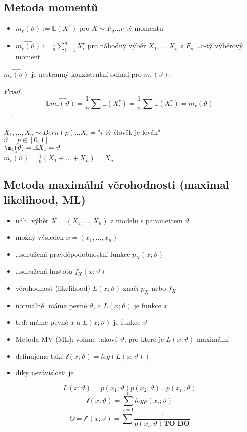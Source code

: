 \documentclass[../main.tex]{subfiles}
\begin{document}
\subsection{Metoda momentů}
\begin{itemize}
    \item $m_r(\vartheta) := \mathbb{E}(X^r)$ pro $X \sim F_\vartheta \dots r$-tý momentu
    \item $\widehat{m_r(\vartheta)}:= \frac{1}{n} \sum^n_{i=1}X^r_i$ pro náhodný výběr $X_1,\dots,X_n$ z $F_\vartheta$ \dots $r$-tý výběrový moment
\end{itemize}
\begin{theorem}
    $\widehat{m_r(\vartheta)}$ je nestranný konzistentní odhad pro $m_r(\vartheta)$.
    \begin{proof}
        \[\mathbb{E}\widehat{m_r(\vartheta)} = \frac{1}{n} \sum \mathbb{E}(X^r_i) = \frac{1}{n}\sum \mathbb{E}(X^r_i) = m_r(\vartheta)\]
    \end{proof}
\end{theorem}
\begin{example}
    $X_1,\dots,X_n \sim Bern(p) \dots X_i = $"$i$-tý člověk je levák"\\
    $\vartheta = p \in \left[0,1\right]$\\
    $\m_1(\vartheta) = \mathbb{E}X_1 = \vartheta$\\
    $\widehat{m_r(\vartheta)} = \frac{1}{n}(X_1+\dots+X_n) = \overline{X}_n$
\end{example}

\subsection{Metoda maximální věrohodnosti (maximal likelihood, ML)}
\begin{itemize}
    \item náh. výběr $X = (X_1,\dots,X_n)$ z modelu s parametrem $\vartheta$
    \item možný výsledek $x = (x_1,\dots,x_n)$
    \item \dots sdružená pravděpodobnostní funkce $p_X(x;\vartheta)$
    \item \dots sdružená hustota $f_X(x;\vartheta)$
    \item věrohodnost (likelihood) $L(x;\vartheta)$ značí $p_X$ nebo $f_X$
    \item normálně: máme pevné $\vartheta$, a $L(x;\vartheta)$ je funkce $x$
    \item teď: máme pevné $x$ a $L(x;\vartheta)$ je funkce $\vartheta$
\end{itemize}
\begin{itemize}
    \item Metoda MV (ML): volíme takové $\vartheta$, pro které je $L(x;\vartheta)$ maximální
    \item definujeme také $\mathcal{l}(x;\vartheta) = log(L(x;\vartheta))$
    \item díky nezávislosti je
\end{itemize}
\[L(x;\vartheta) = p(x_1;\vartheta)p(x_2;\vartheta)\dots p(x_n;\vartheta)\]
\[\mathcal{l}(x;\vartheta) = \sum^n_{i=1} log p(x_i;\vartheta)\]
\[ O = \mathcal{l}'(x;\vartheta) = \sum \frac{1}{p(x_i;\vartheta) \textbf{TO DO}}\]
\end{document}
